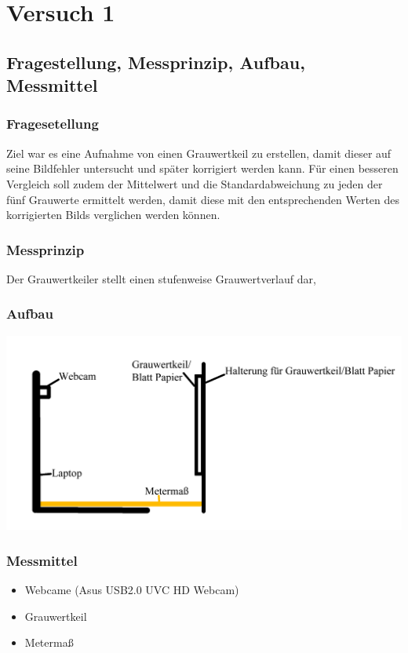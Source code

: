 \chapter{Versuch 1}
\label{chap:VERSUCH_1}


\section{Fragestellung, Messprinzip, Aufbau, Messmittel}
\label{chap:VERSUCH_1_FRAGESTELLUNG}

\subsection*{Fragesetellung}

Ziel war es eine Aufnahme von einen Grauwertkeil zu erstellen, damit dieser auf seine Bildfehler untersucht und später korrigiert werden kann.
Für einen besseren Vergleich soll zudem der Mittelwert und die Standardabweichung zu jeden der fünf Grauwerte ermittelt werden, damit diese mit den entsprechenden Werten des korrigierten Bilds verglichen werden können.

\subsection*{Messprinzip}
Der Grauwertkeiler stellt einen stufenweise Grauwertverlauf dar, 

\subsection*{Aufbau}

\includegraphics[scale=0.4]{media/Versuchsaufbau_2.png}

\subsection*{Messmittel}
\begin{itemize}
\item Webcame (Asus USB2.0 UVC HD Webcam)
\item Grauwertkeil
\item Metermaß
\end{itemize}

